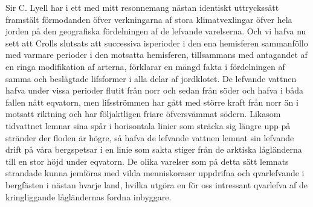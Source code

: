 Sir C. Lyell har i ett med mitt resonnemang nästan identiskt uttryckssätt framstält förmodanden öfver verkningarna af stora klimatvexlingar öfver hela jorden på den geografiska fördelningen af de lefvande varelserna. Och vi hafva nu sett att Crolls slutsats att successiva isperioder i den ena hemisferen sammanföllo med varmare perioder i den motsatta hemisferen, tillsammans med antagandet af en ringa modifikation af arterna, förklarar en mängd fakta i fördelningen af samma och beslägtade lifsformer i alla delar af jordklotet. De lefvande vattnen hafva under vissa perioder flutit från norr och sedan från söder och hafva i båda fallen nått eqvatorn, men lifsströmmen har gått med större kraft från norr än i motsatt riktning och har följaktligen friare öfversvämmat södern. Likasom tidvattnet lemnar sina spår i horisontala linier som sträcka sig längre upp på stränder der floden är högre, så hafva de lefvande vattnen lemnat sin lefvande drift på våra bergspetsar i en linie som sakta stiger från de arktiska lågländerna till en stor höjd under eqvatorn. De olika varelser som på detta sätt lemnats strandade kunna jemföras med vilda menniskoraser uppdrifna och qvarlefvande i bergfästen i nästan hvarje land, hvilka utgöra en för oss intressant qvarlefva af de kringliggande lågländernas fordna inbyggare.
